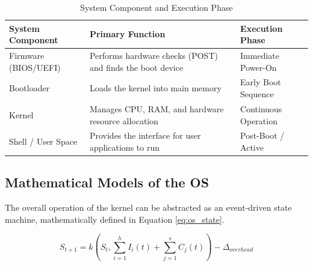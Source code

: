 \documentclass[11pt, a4paper]{article}
\begin{document}
\begin{table}[H]
    \centering
    \caption{System Component and Execution Phase}
    \label{tab:os_components}
    \renewcommand{\arraystretch}{1.4}
    \begin{tabular}{>{\raggedright\arraybackslash}p{3.5cm} >{\raggedright\arraybackslash}p{7cm} >{\raggedright\arraybackslash}p{4cm}}
        \toprule
        \textbf{System Component} & \textbf{Primary Function} & \textbf{Execution Phase} \\
        \midrule
        Firmware (BIOS/UEFI) & Performs hardware checks (POST) and finds the boot device & Immediate Power-On \\
        Bootloader & Loads the kernel into main memory & Early Boot Sequence \\
        Kernel & Manages CPU, RAM, and hardware resource allocation & Continuous Operation \\
        Shell / User Space & Provides the interface for user applications to run & Post-Boot / Active \\
        \bottomrule
    \end{tabular}
\end{table}
\newpage

\subsection{Mathematical Models of the OS}
The overall operation of the kernel can be abstracted as an event-driven state machine, mathematically defined in Equation \ref{eq:os_state}. 

\begin{equation}
    S_{t+1} = k \left( S_t, \sum_{i=1}^{h} I_i(t) + \sum_{j=1}^{s} C_j(t) \right) - \Delta_{overhead}
    \label{eq:os_state}
\end{equation}
\end{document}
